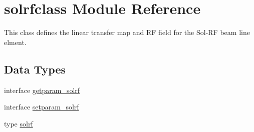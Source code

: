\hypertarget{namespacesolrfclass}{}\section{solrfclass Module Reference}
\label{namespacesolrfclass}


This class defines the linear transfer map and RF field for the Sol-\/\+RF beam line elment.  


\subsection*{Data Types}
\begin{DoxyCompactItemize}
\item 
interface \mbox{\hyperlink{interfacesolrfclass_1_1getparam__solrf}{getparam\+\_\+solrf}}
\item 
interface \mbox{\hyperlink{interfacesolrfclass_1_1setparam__solrf}{setparam\+\_\+solrf}}
\item 
type \mbox{\hyperlink{namespacesolrfclass_structsolrfclass_1_1solrf}{solrf}}
\end{DoxyCompactItemize}
